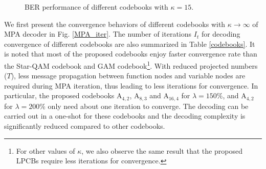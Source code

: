 \documentclass[journal]{IEEEtran}
\begin{document}
 \begin{figure}
\centering
{} 
\caption{BER performance of different codebooks     with $\kappa= 15$. }\label{BER_rician}
	\vspace{-1.5em}	
\end{figure}

We first present  the convergence behaviors of different codebooks with $\kappa \rightarrow \infty$ of MPA decoder in Fig. \ref{MPA_iter}.    The number of iterations $I_t$ for decoding convergence of different codebooks are also summarized in Table \ref{codebooks}.
It is noted that most of the proposed codebooks enjoy   faster convergence rate  than the Star-QAM codebook and GAM codebook\footnote{For other values of $\kappa$, we also observe the same result that the proposed LPCBs require less iterations for convergence.}. With reduced  projected numbers ($T$), less message  propagation  between function nodes and variable nodes are required  during MPA iteration, thus leading to less iterations for convergence.  
In particular,   the proposed codebooks $\text{A}_{4,2}$,  $\text{A}_{8,3}$ and  $\text{A}_{16,4}$ for $\lambda = 150\%$,  and $\text{A}_{4,2}$ for $\lambda = 200\%$ only need about one iteration to converge. The decoding can be carried out in a one-shot for these codebooks and the decoding complexity is significantly reduced compared to other codebooks.   
\end{document}
